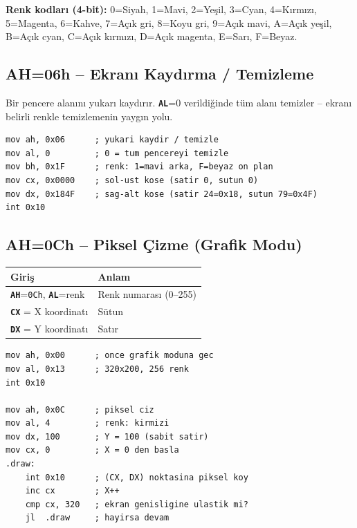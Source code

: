 \documentclass[11pt,a4paper]{article}
\newcommand{\reg}[1]{\texttt{\color{anaMavi}\textbf{#1}}}
\newcommand{\hx}[1]{\texttt{\color{turuncu}#1}}
\begin{document}
\begin{bilgikutu}
\textbf{Renk kodları (4-bit):}
0=Siyah, 1=Mavi, 2=Yeşil, 3=Cyan, 4=Kırmızı, 5=Magenta, 6=Kahve, 7=Açık gri,
8=Koyu gri, 9=Açık mavi, A=Açık yeşil, B=Açık cyan, C=Açık kırmızı,
D=Açık magenta, E=Sarı, F=Beyaz.
\end{bilgikutu}

\subsection{AH=06h -- Ekranı Kaydırma / Temizleme}

Bir pencere alanını yukarı kaydırır. \reg{AL}=0 verildiğinde tüm alanı
temizler -- ekranı belirli renkle temizlemenin yaygın yolu.

\begin{ornekkutu}
\begin{lstlisting}
mov ah, 0x06      ; yukari kaydir / temizle
mov al, 0         ; 0 = tum pencereyi temizle
mov bh, 0x1F      ; renk: 1=mavi arka, F=beyaz on plan
mov cx, 0x0000    ; sol-ust kose (satir 0, sutun 0)
mov dx, 0x184F    ; sag-alt kose (satir 24=0x18, sutun 79=0x4F)
int 0x10
\end{lstlisting}
\end{ornekkutu}

\subsection{AH=0Ch -- Piksel Çizme (Grafik Modu)}

\begin{center}
\begin{tabularx}{\textwidth}{@{}l >{\raggedright\arraybackslash}X@{}}
\toprule
\rowcolor{acikMavi}\color{anaMavi}\textbf{Giriş} & \color{anaMavi}\textbf{Anlam} \\
\midrule
\reg{AH}=\hx{0Ch}, \reg{AL}=renk & Renk numarası (0--255) \\
\reg{CX} = X koordinatı & Sütun \\
\reg{DX} = Y koordinatı & Satır \\
\bottomrule
\end{tabularx}
\end{center}

\begin{ornekkutu}
\begin{lstlisting}
mov ah, 0x00      ; once grafik moduna gec
mov al, 0x13      ; 320x200, 256 renk
int 0x10

mov ah, 0x0C      ; piksel ciz
mov al, 4         ; renk: kirmizi
mov dx, 100       ; Y = 100 (sabit satir)
mov cx, 0         ; X = 0 den basla
.draw:
    int 0x10      ; (CX, DX) noktasina piksel koy
    inc cx        ; X++
    cmp cx, 320   ; ekran genisligine ulastik mi?
    jl  .draw     ; hayirsa devam
\end{lstlisting}
\end{ornekkutu}
\end{document}
